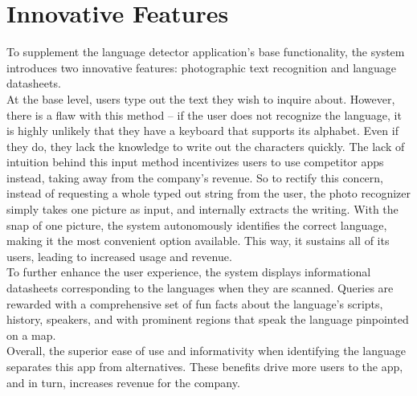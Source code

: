 \section{Innovative Features}
\label{sec:innovative_features}


To supplement the language detector application’s base functionality, the system introduces two innovative features: photographic text recognition and language datasheets.\\

At the base level, users type out the text they wish to inquire about. However, there is a flaw with this method – if the user does not recognize the language, it is highly unlikely that they have a keyboard that supports its alphabet. Even if they do, they lack the knowledge to write out the characters quickly. The lack of intuition behind this input method incentivizes users to use competitor apps instead, taking away from the company’s revenue. So to rectify this concern, instead of requesting a whole typed out string from the user, the photo recognizer simply takes one picture as input, and internally extracts the writing. With the snap of one picture, the system autonomously identifies the correct language, making it the most convenient option available. This way, it sustains all of its users, leading to increased usage and revenue.\\

To further enhance the user experience, the system displays informational datasheets corresponding to the languages when they are scanned. Queries are rewarded with a comprehensive set of fun facts about the language’s scripts, history, speakers, and with prominent regions that speak the language pinpointed on a map.\\

Overall, the superior ease of use and informativity when identifying the language separates this app from alternatives. These benefits drive more users to the app, and in turn, increases revenue for the company.\\  

